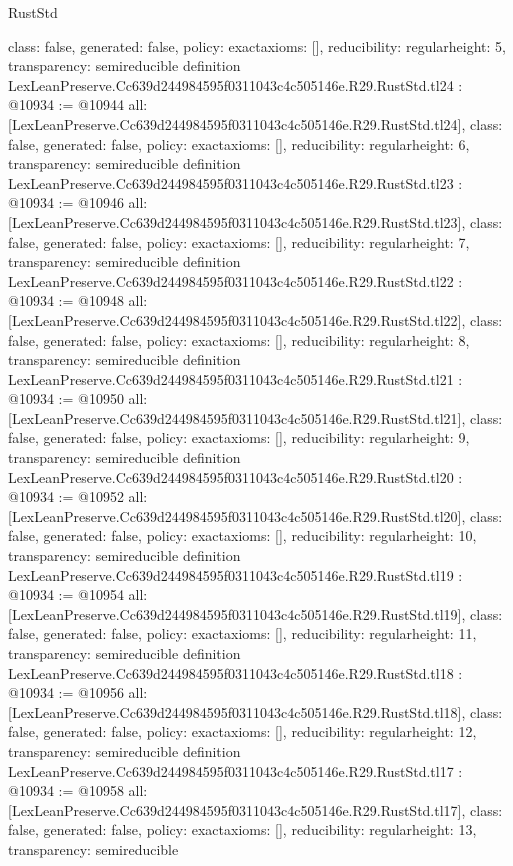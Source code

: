 \begin{lexlean}{RustStd}
\begin{coremodule}
{  class: false,
  generated: false,
  policy: exact{axioms: []},
  reducibility: regular{height: 5},
  transparency: semireducible
}
definition LexLeanPreserve.Cc639d244984595f0311043c4c505146e.R29.RustStd.tl24 : @10934 := @10944 {
  all: [LexLeanPreserve.Cc639d244984595f0311043c4c505146e.R29.RustStd.tl24],
  class: false,
  generated: false,
  policy: exact{axioms: []},
  reducibility: regular{height: 6},
  transparency: semireducible
}
definition LexLeanPreserve.Cc639d244984595f0311043c4c505146e.R29.RustStd.tl23 : @10934 := @10946 {
  all: [LexLeanPreserve.Cc639d244984595f0311043c4c505146e.R29.RustStd.tl23],
  class: false,
  generated: false,
  policy: exact{axioms: []},
  reducibility: regular{height: 7},
  transparency: semireducible
}
definition LexLeanPreserve.Cc639d244984595f0311043c4c505146e.R29.RustStd.tl22 : @10934 := @10948 {
  all: [LexLeanPreserve.Cc639d244984595f0311043c4c505146e.R29.RustStd.tl22],
  class: false,
  generated: false,
  policy: exact{axioms: []},
  reducibility: regular{height: 8},
  transparency: semireducible
}
definition LexLeanPreserve.Cc639d244984595f0311043c4c505146e.R29.RustStd.tl21 : @10934 := @10950 {
  all: [LexLeanPreserve.Cc639d244984595f0311043c4c505146e.R29.RustStd.tl21],
  class: false,
  generated: false,
  policy: exact{axioms: []},
  reducibility: regular{height: 9},
  transparency: semireducible
}
definition LexLeanPreserve.Cc639d244984595f0311043c4c505146e.R29.RustStd.tl20 : @10934 := @10952 {
  all: [LexLeanPreserve.Cc639d244984595f0311043c4c505146e.R29.RustStd.tl20],
  class: false,
  generated: false,
  policy: exact{axioms: []},
  reducibility: regular{height: 10},
  transparency: semireducible
}
definition LexLeanPreserve.Cc639d244984595f0311043c4c505146e.R29.RustStd.tl19 : @10934 := @10954 {
  all: [LexLeanPreserve.Cc639d244984595f0311043c4c505146e.R29.RustStd.tl19],
  class: false,
  generated: false,
  policy: exact{axioms: []},
  reducibility: regular{height: 11},
  transparency: semireducible
}
definition LexLeanPreserve.Cc639d244984595f0311043c4c505146e.R29.RustStd.tl18 : @10934 := @10956 {
  all: [LexLeanPreserve.Cc639d244984595f0311043c4c505146e.R29.RustStd.tl18],
  class: false,
  generated: false,
  policy: exact{axioms: []},
  reducibility: regular{height: 12},
  transparency: semireducible
}
definition LexLeanPreserve.Cc639d244984595f0311043c4c505146e.R29.RustStd.tl17 : @10934 := @10958 {
  all: [LexLeanPreserve.Cc639d244984595f0311043c4c505146e.R29.RustStd.tl17],
  class: false,
  generated: false,
  policy: exact{axioms: []},
  reducibility: regular{height: 13},
  transparency: semireducible
}
\end{coremodule}
\end{lexlean}

